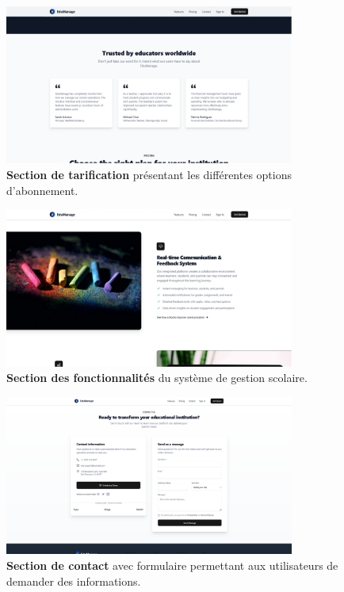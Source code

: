 \begin{figure}[H]
  \centering
  \includegraphics[width=0.85\textwidth,keepaspectratio]{pfe-pics/landing/Screenshot 2025-06-09 at 23-12-47 Vite React TS.png}
  \caption{\textbf{Section de tarification} présentant les différentes options d'abonnement.}
  \label{fig:landing_pricing}
\end{figure}

\begin{figure}[H]
  \centering
  \includegraphics[width=0.85\textwidth,keepaspectratio]{pfe-pics/landing/Screenshot 2025-06-09 at 23-12-17 Vite React TS.png}
  \caption{\textbf{Section des fonctionnalités} du système de gestion scolaire.}
  \label{fig:landing_features}
\end{figure}

\begin{figure}[H]
  \centering
  \includegraphics[width=0.85\textwidth,keepaspectratio]{pfe-pics/landing/contact.png}
  \caption{\textbf{Section de contact} avec formulaire permettant aux utilisateurs de demander des informations.}
  \label{fig:landing_contact}
\end{figure}

